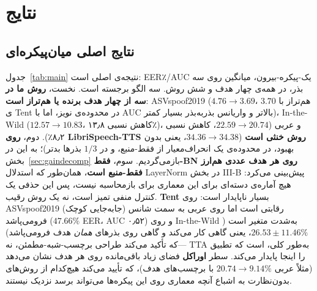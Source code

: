 \documentclass[a4paper,11pt]{article}
\begin{document}
\section{نتایج}
\subsection{نتایج اصلی میان‌پیکره‌ای}
\label{sec:main-results}
جدول~\ref{tab:main} نتیجه‌ی اصلی است: EER٪/AUC یک-پیکره-بیرون، میانگین روی
سه بذر، در همه‌ی چهار هدف و شش روش. سه الگو برجسته است. نخست، \textbf{روش
ما در سه از چهار هدف برنده یا هم‌تراز است}: ASVspoof2019
($4.76\!\to\!3.69$، هم‌تراز با $3.70$ی Tent در محدوده‌ی نویز، اما با AUC
بالاتر و واریانس بذر‌به‌بذر بسیار کمتر)، In-the-Wild ($12.57\!\to\!10.83$،
کاهش نسبی ۱۳٫۸٪)، و عربی ($22.59\!\to\!20.74$، کاهش نسبی ۸٫۲٪). دوم،
\textbf{روی LibriSpeech-TTS روش خنثی است} ($34.36\!\to\!34.38$، یعنی بدون
بهبود، در محدوده‌ی یک انحراف‌معیار از فقط-منبع، و در $1/3$ بذرها بدتر)؛ به
این در بخش~\ref{sec:gaindecomp} بازمی‌گردیم. سوم، \textbf{فقط-BN روی هر
هدف عددی هم‌ارز فقط-منبع است}، همان‌طور که استدلال LayerNorm در بخش
III-B پیش‌بینی می‌کرد: هیچ آماره‌ی دسته‌ای برای این معماری برای بازمحاسبه
نیست، پس این حذفی یک کنترل منفی تمیز است، نه یک روش رقیب. \textbf{Tent}
بسیار ناپایدار است: روی ASVspoof2019 (جابه‌جایی کوچک) رقابتی است اما روی
عربی به سمت شانس فرومی‌پاشد ($47.66\%$ EER، AUC ۰٫۵۲) و روی In-the-Wild
به‌شدت متغیر است ($26.53\!\pm\!11.46\%$، یعنی گاهی کار می‌کند و گاهی روی
بذرهای \emph{همان} هدف فرومی‌پاشد)---که تأکید می‌کند طراحی برچسب-شبه-مطمئن،
نه TTA به‌طور کلی، است که تطبیق را اینجا پایدار می‌کند. سطر \textbf{اوراکل}
فضای زیاد باقی‌مانده روی هر هدف نشان می‌دهد (مثلاً عربی $20.74\!\to\!9.14\%$
با برچسب‌های هدف)، که تأیید می‌کند هیچ‌کدام از روش‌های بدون‌نظارت به
اشباع آنچه معماری روی این پیکره‌ها می‌تواند برسد نزدیک نیستند.
\end{document}
